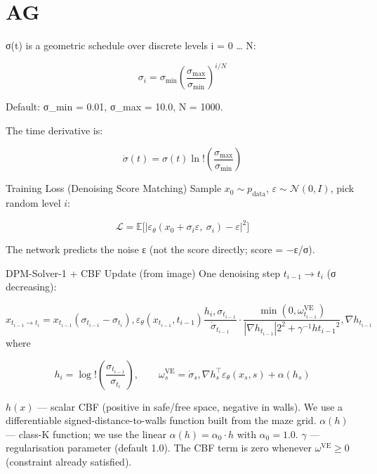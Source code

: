 \documentclass{article}
\begin{document}
\section{AG}

σ(t) is a geometric schedule over discrete levels i = 0 … N:

$$\sigma_i = \sigma_{\min} \left(\frac{\sigma_{\max}}{\sigma_{\min}}\right)^{i/N}$$

Default: σ_min = 0.01, σ_max = 10.0, N = 1000.

The time derivative is:

$$\dot{\sigma}(t) = \sigma(t) \ln!\left(\frac{\sigma_{\max}}{\sigma_{\min}}\right)$$

Training Loss (Denoising Score Matching)
Sample $x_0 \sim p_{\text{data}}$, $\varepsilon \sim \mathcal{N}(0, I)$, pick random level $i$:

$$\mathcal{L} = \mathbb{E}\bigl[|\varepsilon_\theta(x_0 + \sigma_i \varepsilon,\ \sigma_i) - \varepsilon|^2\bigr]$$

The network predicts the noise ε (not the score directly; score = −ε/σ).

DPM-Solver-1 + CBF Update (from image)
One denoising step $t_{i-1} \to t_i$ (σ decreasing):

$$ x_{t_{i-1} \to t_i} = x_{t_{i-1}}
(\sigma_{t_{i-1}} - \sigma_{t_i}),\varepsilon_\theta(x_{t_{i-1}}, t_{i-1})
\frac{h_i ,\sigma_{t_{i-1}}}{\dot\sigma_{t_{i-1}}} \cdot \frac{\min(0,\omega_{t_{i-1}}^{\text{VE}})} {|\nabla h_{t_{i-1}}|2^2 + \gamma^{-1} h{t_{i-1}}^2} ,\nabla h_{t_{i-1}} $$
where

$$ h_i = \log!\left(\frac{\sigma_{t_{i-1}}}{\sigma_{t_i}}\right), \qquad \omega_s^{\text{VE}} = \dot\sigma_s,\nabla h_s^\top \varepsilon_\theta(x_s, s) + \alpha(h_s) $$

$h(x)$ — scalar CBF (positive in safe/free space, negative in walls). We use a differentiable signed-distance-to-walls function built from the maze grid.
$\alpha(h)$ — class-K function; we use the linear $\alpha(h) = \alpha_0 \cdot h$ with $\alpha_0 = 1.0$.
$\gamma$ — regularisation parameter (default 1.0).
The CBF term is zero whenever $\omega^{\text{VE}} \ge 0$ (constraint already satisfied).
\end{document}
